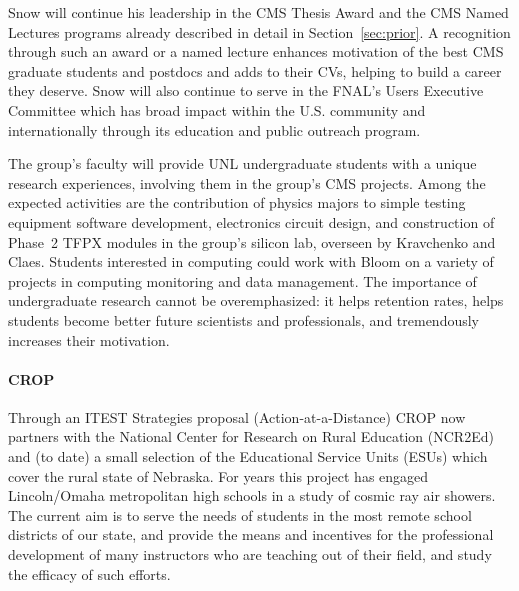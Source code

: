 
\noindent
Snow will continue his leadership in the CMS Thesis Award and the CMS Named Lectures programs already described in detail in Section~\ref{sec:prior}. A recognition through such an award or a named lecture enhances motivation of the best CMS graduate students and postdocs and adds to their CVs, helping to build a career they deserve.  Snow will also continue to serve in the FNAL's Users Executive Committee which has broad impact within the U.S. community and internationally through its education and public outreach program.

The group's faculty will provide UNL undergraduate students with a unique research experiences, involving them in the group's CMS projects. Among the expected activities are the contribution of physics majors to simple testing equipment software development, electronics circuit design, and construction of Phase~2 TFPX modules in the group's silicon lab, overseen by Kravchenko and Claes. Students interested in computing could work with Bloom on a variety of projects in computing monitoring and data management.  The importance of undergraduate research cannot be  overemphasized: it helps retention rates, helps students become better future 
scientists and professionals, and tremendously increases their motivation.

\paragraph{CROP}
Through an ITEST Strategies proposal (Action-at-a-Distance) CROP now partners with the National Center for Research on Rural Education (NCR2Ed) and (to date) a small selection of the Educational Service Units (ESUs) which cover the rural state of Nebraska. For years this project has engaged Lincoln/Omaha metropolitan high schools in a study of cosmic ray air showers. The current aim is to serve the needs of students in the most remote school districts of our state, and provide the means and incentives for the professional development of many instructors who are teaching out of their field, and study the efficacy of such efforts. 

